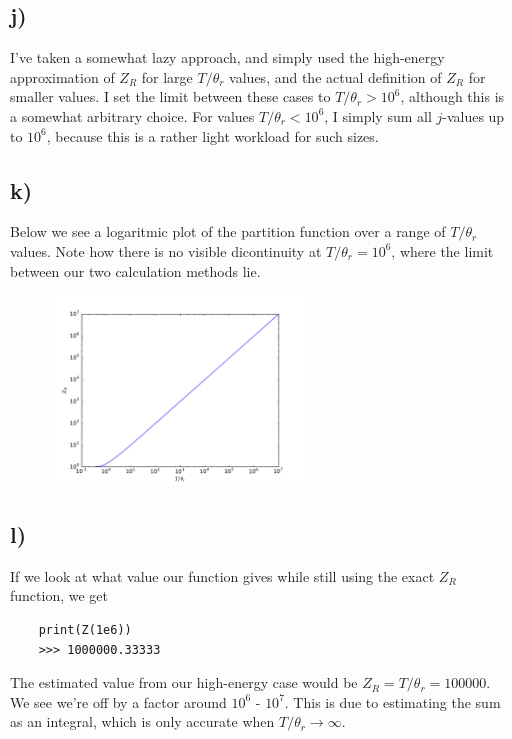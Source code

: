 \documentclass[12p,a4paper]{article}
\begin{document}
\subsection*{j)}
I've taken a somewhat lazy approach, and simply used the high-energy approximation of $Z_R$ for large $T/\theta_r$ values, and the actual definition of $Z_R$ for smaller values. I set the limit between these cases to $T/\theta_r > 10^6$, although this is a somewhat arbitrary choice. For values $T/\theta_r < 10^6$, I simply sum all $j$-values up to $10^6$, because this is a rather light workload for such sizes.


\subsection*{k)}
Below we see a logaritmic plot of the partition function over a range of $T/\theta_r$ values. Note how there is no visible dicontinuity at $T/\theta_r = 10^6$, where the limit between our two calculation methods lie.
\begin{figure}[H]
    \centering
    \includegraphics[width=0.6\textwidth]{taskj.pdf}
\end{figure}



\subsection*{l)}
If we look at what value our function gives while still using the exact $Z_R$ function, we get
\begin{verbatim}
    print(Z(1e6))
    >>> 1000000.33333
\end{verbatim}
The estimated value from our high-energy case would be $Z_R = T/\theta_r = 100000$. We see we're off by a factor around $10^6$ - $10^7$. This is due to estimating the sum as an integral, which is only accurate when $T/\theta_r \rightarrow \infty$.
\end{document}
